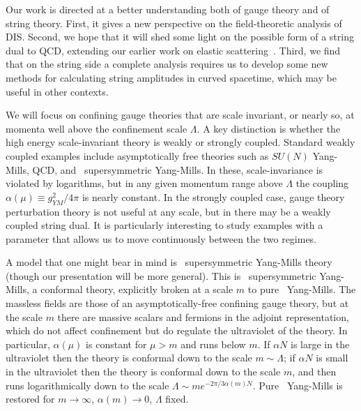 Our work is directed at a better understanding both of gauge theory and
of string theory.  First, it gives a new perspective on the
field-theoretic analysis of DIS.  Second, we hope that it will shed
some light on the possible form of a string dual to QCD, extending our
earlier work on elastic scattering~\cite{PShard}.  Third, we find that
on the string side a complete analysis requires us to develop some new
methods for calculating string amplitudes in curved spacetime, which
may be useful in other contexts.

We will focus on confining gauge theories that are scale invariant, or
nearly so, at momenta well above the confinement scale $\Lambda$.  A
key distinction is whether the high energy scale-invariant theory is
weakly or strongly coupled.  Standard weakly coupled examples include
asymptotically free theories such as $SU(N)$ Yang-Mills, QCD, and
\none\ supersymmetric Yang-Mills.  In these, scale-invariance is
violated by logarithms, but in any given momentum range above
$\Lambda$ the coupling $\alpha(\mu)\equiv g_{YM}^2/4\pi$ is nearly
constant.  In the strongly coupled case, gauge theory perturbation
theory is not useful at any scale, but in there may be a weakly
coupled string dual.  It is particularly interesting to study examples
with a parameter that allows us to move continuously between the two
regimes.

A model that one might bear in mind is \nonestar\
supersymmetric Yang-Mills theory~\cite{rdew,PS} (though our presentation
will be more general).  This is \nfour\ supersymmetric Yang-Mills, a
conformal theory, explicitly broken at a scale $m$ to pure \none\
Yang-Mills.  The massless fields are those of an asymptotically-free
confining gauge theory, but at the scale $m$ there are massive scalars
and fermions in the adjoint representation, which do not affect
confinement but do regulate the ultraviolet of the theory.  In
particular, $\alpha(\mu)$ is constant for $\mu>m$ and runs below $m$.
If $\alpha N$ is large in the ultraviolet then the theory is conformal
down to the scale $m\sim \Lambda$; if $\alpha N$ is small in the
ultraviolet then the theory is conformal down to the scale $m$, and
then runs logarithmically down to the scale $\Lambda\sim m
e^{-2\pi/3\alpha(m) N}$.  Pure \none\ Yang-Mills is restored for
$m\to\infty$, $\alpha(m)\to 0$, $\Lambda$ fixed.

